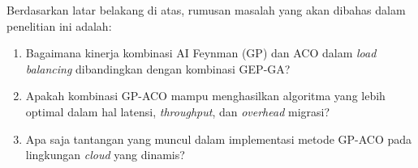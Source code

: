Berdasarkan latar belakang di atas, rumusan masalah yang akan dibahas dalam penelitian ini adalah:

\begin{enumerate}
  \item Bagaimana kinerja kombinasi AI Feynman (GP) dan ACO dalam \textit{load balancing} dibandingkan dengan kombinasi GEP-GA?
  \item Apakah kombinasi GP-ACO mampu menghasilkan algoritma yang lebih optimal dalam hal latensi, \textit{throughput}, dan \textit{overhead} migrasi?
  \item Apa saja tantangan yang muncul dalam implementasi metode GP-ACO pada lingkungan \textit{cloud} yang dinamis?
\end{enumerate}
